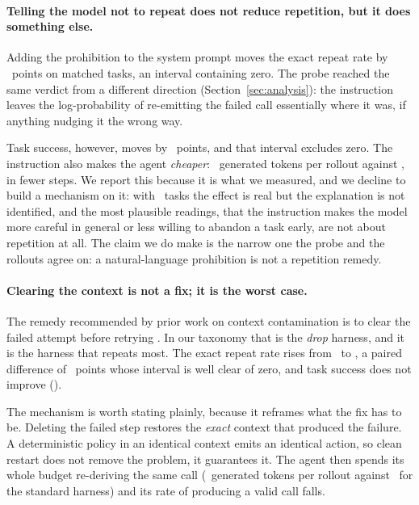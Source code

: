 \paragraph{Telling the model not to repeat does not reduce repetition, but it
does something else.}
Adding the prohibition to the system prompt moves the exact repeat rate by
\DeltaInstrRepeat\ points on matched tasks, an interval containing zero. The
probe reached the same verdict from a different direction
(Section~\ref{sec:analysis}): the instruction leaves the log-probability of
re-emitting the failed call essentially where it was, if anything nudging it the
wrong way.

Task success, however, moves by \DeltaInstrSuccess\ points, and that interval
excludes zero. The instruction also makes the agent \emph{cheaper}:
\AgentInstrTokens\ generated tokens per rollout against
\AgentVerbatimTokens, in fewer steps. We report this because it is what we
measured, and we decline to build a mechanism on it: with
\AgentNumTasks\ tasks the effect is real but the explanation is not identified,
and the most plausible readings, that the instruction makes the model more
careful in general or less willing to abandon a task early, are not about
repetition at all. The claim we do make is the narrow one the probe and the rollouts agree
on: a natural-language prohibition is not a repetition remedy.

\paragraph{Clearing the context is not a fix; it is the worst case.}
The remedy recommended by prior work on context contamination is to clear the
failed attempt before retrying \citep{yang2026contamination}. In our taxonomy
that is the \emph{drop} harness, and it is the harness that repeats most. The
exact repeat rate rises from \AgentVerbatimRepeat\ to \AgentDropRepeat, a
paired difference of \DeltaDropRepeat\ points whose interval is well clear of
zero, and task success does not improve (\DeltaDropSuccess).

The mechanism is worth stating plainly, because it reframes what the fix has to
be. Deleting the failed step restores the \emph{exact} context that produced the
failure. A deterministic policy in an identical context emits an identical action, so
clean restart does not remove the problem, it guarantees it. The
agent then spends its whole budget re-deriving the same call
(\AgentDropTokens\ generated tokens per rollout against
\AgentVerbatimTokens\ for the standard harness) and its rate of producing a
valid call falls.

